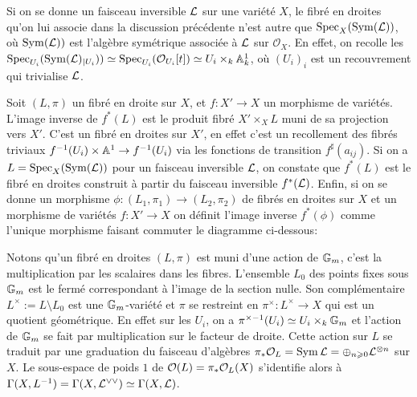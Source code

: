 \begin{rem}
Si on se donne un faisceau inversible $\mathcal{L}$ sur une variété $X$, le fibré en droites qu'on lui associe dans la discussion précédente n'est autre que $\operatorname{Spec}_X(\operatorname{Sym}(\mathcal{L}))$, où $\operatorname{Sym}(\mathcal{L}))$ est l'algèbre symétrique associée à $\mathcal{L}$ sur $\mathcal{O}_X$. En effet, on recolle les $\operatorname{Spec}_{U_i}(\operatorname{Sym}(\mathcal{L})_{|U_i}))\simeq\operatorname{Spec}_{U_i}( \mathcal{O}_{U_i}[t])\simeq U_i \times_k \mathbb{A}^1_k$, où $(U_i)_i$ est un recouvrement qui trivialise $\mathcal{L}$.
\end{rem}

Soit $(L,\pi)$ un fibré en droite sur $X$, et $f:X'\rightarrow X$ un morphisme de variétés. L'image inverse de $f^*(L)$ est le produit fibré $X'\times_X L$ muni de sa projection vers $X'$. C'est un fibré en droites sur $X'$, en effet c'est un recollement des fibrés triviaux $f^{-1}(U_i)\times \mathbb{A}^1\rightarrow f^{-1}(U_i)$ via les fonctions de transition $f^\sharp(a_{ij})$. Si on a $L=\operatorname{Spec}_X(\operatorname{Sym}(\mathcal{L}))$ pour un faisceau inversible $\mathcal{L}$, on constate que $f^*(L)$ est le fibré en droites construit à partir du faisceau inversible $f^*(\mathcal{L})$. Enfin, si on se donne un morphisme $\phi:(L_1,\pi_1)\rightarrow (L_2,\pi_2)$ de fibrés en droites sur $X$ et un morphisme de variétés $f:X'\rightarrow X$ on définit l'image inverse $f^*(\phi)$ comme l'unique morphisme faisant commuter le diagramme ci-dessous:

	\begin{center}
	\end{center}

\begin{rem}\label{remfibsectionsglobales}
Notons qu'un fibré en droites $(L, \pi)$ est muni d'une action de $\mathbb{G}_m$, c'est la multiplication par les scalaires dans les fibres. L'ensemble $L_0$ des points fixes sous $\mathbb{G}_m$ est le fermé correspondant à l'image de la section nulle. Son complémentaire $L^\times:=L\setminus L_0$ est une $\mathbb{G}_m$-variété et $\pi$ se restreint en $\pi^\times: L^\times \rightarrow X$ qui est un quotient géométrique. En effet sur les $U_i$, on a $\pi^{\times-1}(U_i) \simeq U_i\times_k \mathbb{G}_m$ et l'action de $\mathbb{G}_m$ se fait par multiplication sur le facteur de droite. Cette action sur $L$  se traduit par une graduation du faisceau d'algèbres $\pi_*\mathcal{O}_L=\operatorname{Sym}\mathcal{L}=\oplus_{n\geqslant 0}\mathcal{L}^{\otimes n}$ sur $X$. Le sous-espace de poids $1$ de $\mathcal{O}(L)=\pi_*\mathcal{O}_L(X)$ s'identifie alors à $\Gamma(X,L^{-1})=\Gamma(X,\mathcal{L}^{\vee\vee})\simeq\Gamma(X,\mathcal{L})$.
\end{rem}

